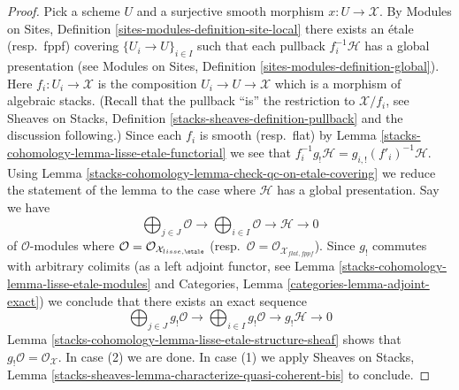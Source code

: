 \begin{proof}
Pick a scheme $U$ and a surjective smooth morphism $x : U \to \mathcal{X}$.
By
Modules on Sites, Definition \ref{sites-modules-definition-site-local}
there exists an \'etale (resp.\ fppf) covering
$\{U_i \to U\}_{i \in I}$ such that each pullback $f_i^{-1}\mathcal{H}$
has a global presentation (see
Modules on Sites, Definition \ref{sites-modules-definition-global}).
Here $f_i : U_i \to \mathcal{X}$ is the composition
$U_i \to U \to \mathcal{X}$ which is a morphism of algebraic stacks.
(Recall that the pullback ``is'' the restriction to $\mathcal{X}/f_i$, see
Sheaves on Stacks, Definition \ref{stacks-sheaves-definition-pullback}
and the discussion following.) Since each $f_i$ is smooth (resp.\ flat) by
Lemma \ref{stacks-cohomology-lemma-lisse-etale-functorial}
we see that $f_i^{-1}g_!\mathcal{H} = g_{i, !}(f'_i)^{-1}\mathcal{H}$.
Using Lemma \ref{stacks-cohomology-lemma-check-qc-on-etale-covering}
we reduce the statement of the lemma to the case where $\mathcal{H}$
has a global presentation. Say we have
$$
\bigoplus\nolimits_{j \in J} \mathcal{O} \longrightarrow
\bigoplus\nolimits_{i \in I} \mathcal{O} \longrightarrow
\mathcal{H} \longrightarrow 0
$$
of $\mathcal{O}$-modules where
$\mathcal{O} = \mathcal{O}_{\mathcal{X}_{lisse,\etale}}$
(resp.\ $\mathcal{O} = \mathcal{O}_{\mathcal{X}_{flat,fppf}}$).
Since $g_!$ commutes with arbitrary colimits (as a left adjoint functor, see
Lemma \ref{stacks-cohomology-lemma-lisse-etale-modules} and
Categories, Lemma \ref{categories-lemma-adjoint-exact})
we conclude that there exists an exact sequence
$$
\bigoplus\nolimits_{j \in J} g_!\mathcal{O} \longrightarrow
\bigoplus\nolimits_{i \in I} g_!\mathcal{O} \longrightarrow
g_!\mathcal{H} \longrightarrow 0
$$
Lemma \ref{stacks-cohomology-lemma-lisse-etale-structure-sheaf}
shows that $g_!\mathcal{O} = \mathcal{O}_\mathcal{X}$.
In case (2) we are done. In case (1) we apply
Sheaves on Stacks, Lemma
\ref{stacks-sheaves-lemma-characterize-quasi-coherent-bis}
to conclude.
\end{proof}

